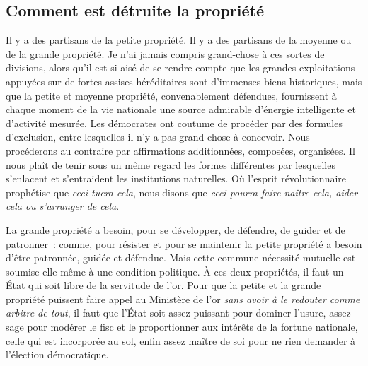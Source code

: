 \documentclass[french,twoside]{book} %
\begin{document}
\subsection[Comment est détruite la propriété]{Comment est détruite la propriété}
\noindent Il y a des partisans de la petite propriété. Il y a des partisans de la moyenne ou de la grande propriété. Je n’ai jamais compris grand-chose à ces sortes de divisions, alors qu’il est si aisé de se rendre compte que les grandes exploitations appuyées sur de fortes assises héréditaires sont d’immenses biens historiques, mais que la petite et moyenne propriété, convenablement défendues, fournissent à chaque moment de la vie nationale une source admirable d’énergie intelligente et d’activité mesurée. Les démocrates ont coutume de procéder par des formules d’exclusion, entre lesquelles il n’y a pas grand-chose à concevoir. Nous procéderons au contraire par affirmations additionnées, composées, organisées. Il nous plaît de tenir sous un même regard les formes différentes par lesquelles s’enlacent et s’entraident les institutions naturelles. Où l’esprit révolutionnaire prophétise que \emph{ceci tuera cela}, nous disons que \emph{ceci pourra faire naître cela, aider cela ou s’arranger de cela}.\par
La grande propriété a besoin, pour se développer, de défendre, de guider et de patronner : comme, pour résister et pour se maintenir la petite propriété a besoin d’être patronnée, guidée et défendue. Mais cette commune nécessité mutuelle est soumise elle-même à une condition politique. À ces deux propriétés, il faut un État qui soit libre de la servitude de l’or. Pour que la petite et la grande propriété puissent faire appel au Ministère de l’or \emph{sans avoir à le redouter comme arbitre de tout}, il faut que l’État soit assez puissant pour dominer l’usure, assez sage pour modérer le fisc et le proportionner aux intérêts de la fortune nationale, celle qui est incorporée au sol, enfin assez maître de soi pour ne rien demander à l’élection démocratique.
\end{document}
